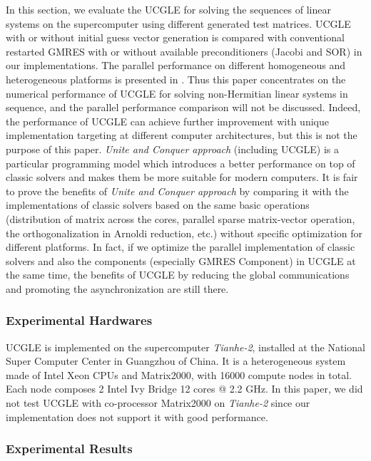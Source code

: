 In this section, we evaluate the UCGLE for solving the sequences of linear systems on the supercomputer using different generated test matrices. UCGLE with or without initial guess vector generation is compared with conventional restarted GMRES with or without available preconditioners (Jacobi and SOR) in our implementations. The parallel performance on different homogeneous and heterogeneous platforms is presented in \cite{Wu:2018:DPA:3149457.3154481}. Thus this paper concentrates on the numerical performance of UCGLE for solving non-Hermitian linear systems in sequence, and the parallel performance comparison will not be discussed. Indeed, the performance of UCGLE can achieve further improvement with unique implementation targeting at different computer architectures, but this is not the purpose of this paper. \textit{Unite and Conquer approach} (including UCGLE) is a particular programming model which introduces a better performance on top of classic solvers and makes them be more suitable for modern computers. It is fair to prove the benefits of \textit{Unite and Conquer approach} by comparing it with the implementations of classic solvers based on the same basic operations (distribution of matrix across the cores, parallel sparse matrix-vector operation, the orthogonalization in Arnoldi reduction, etc.) without specific optimization for different platforms. In fact, if we optimize the parallel implementation of classic solvers and also the components (especially GMRES Component) in UCGLE at the same time, the benefits of UCGLE by reducing the global communications and promoting the asynchronization are still there.  

\subsubsection{Experimental Hardwares}

UCGLE is implemented on the supercomputer \textit{Tianhe-2}, installed at the National Super Computer Center in Guangzhou of China. It is a heterogeneous system made of Intel Xeon CPUs and Matrix2000, with 16000 compute nodes in total. Each node composes 2 Intel Ivy Bridge 12 cores @ 2.2 GHz. In this paper, we did not test UCGLE with co-processor Matrix2000 on \textit{Tianhe-2} since our implementation does not support it with good performance. 

\subsubsection{Experimental Results}

